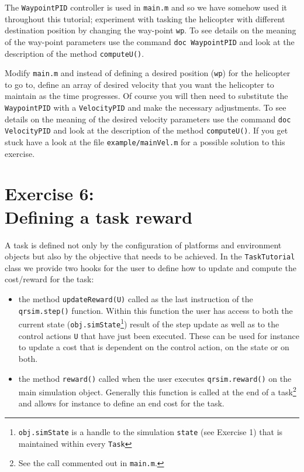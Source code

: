 \documentclass[a4paper,11pt]{article}
\begin{document}
The \texttt{WaypointPID} controller is used in \texttt{main.m} and so we have somehow used it throughout this tutorial; experiment with tasking the helicopter with different destination position by changing the way-point \texttt{wp}. To see details on the meaning of the way-point parameters use the command \texttt{doc WaypointPID} and look at the description of the method \texttt{computeU()}.   

Modify \texttt{main.m} and instead of defining a desired position (\texttt{wp}) for the helicopter to go to, define an array of desired velocity that you want the helicopter to maintain as the time progresses.
Of course you will then need to substitute the \texttt{WaypointPID}  with a \texttt{VelocityPID} and make the necessary adjustments. To see details on the meaning of the desired velocity parameters use the command \texttt{doc VelocityPID} and look at the description of the method \texttt{computeU()}.   
If you get stuck have a look at the file \texttt{example/mainVel.m} for a possible solution to this exercise.


\section*{Exercise 6:\\Defining a task reward}

A task is defined not only by the configuration of platforms and environment objects but also by the objective that needs to be achieved.
In the \texttt{TaskTutorial} class we provide two hooks for the user to define how to update and compute the cost/reward for the task:
\begin{itemize}
 \item the method \texttt{updateReward(U)} called as the last instruction of the \texttt{qrsim.step()} function. Within this function the user has access to both the current state (\texttt{obj.simState}\footnote{\texttt{obj.simState} is a handle to the simulation \texttt{state} (see Exercise 1) that is maintained within every \texttt{Task}}) result of the step update as well as to the control actions \texttt{U} that have just been executed. These can be used for instance to update a cost that is dependent on the control action, on the state or on both. 

 \item the method \texttt{reward()} called when the user executes \texttt{qrsim.reward()} on the main simulation object. Generally this function is called at the end of a task\footnote{See the call commented out in \texttt{main.m}.} and allows for instance to define an end cost for the task.
\end{itemize}
  
\end{document}
